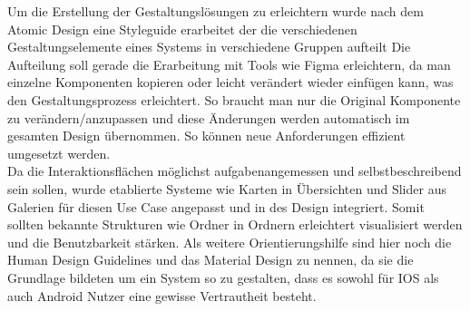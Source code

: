 Um die Erstellung der Gestaltungslösungen zu erleichtern wurde nach dem Atomic Design eine Styleguide erarbeitet der die verschiedenen Gestaltungselemente eines Systems in verschiedene Gruppen aufteilt
Die Aufteilung soll gerade die Erarbeitung mit Tools wie Figma erleichtern, da man einzelne Komponenten kopieren oder leicht verändert wieder einfügen kann, was den Gestaltungsprozess erleichtert. So braucht man nur die Original Komponente zu verändern/anzupassen und diese Änderungen werden automatisch im gesamten Design übernommen. So können neue Anforderungen effizient umgesetzt werden. \\
Da die Interaktionsflächen möglichst aufgabenangemessen und selbstbeschreibend sein sollen, wurde etablierte Systeme wie Karten in Übersichten und Slider aus Galerien für diesen Use Case angepasst und in des Design integriert. Somit sollten bekannte Strukturen wie Ordner in Ordnern erleichtert visualisiert werden und die Benutzbarkeit stärken. Als weitere Orientierungshilfe sind hier noch die Human Design Guidelines und das Material Design zu nennen, da sie die Grundlage bildeten um ein System so zu gestalten, dass es sowohl für IOS als auch Android Nutzer eine gewisse Vertrautheit besteht.

